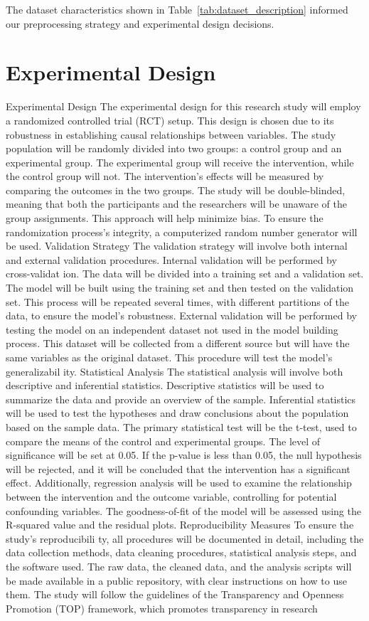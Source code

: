 \documentclass[conference]{IEEEtran}
\begin{document}
The dataset characteristics shown in Table~\ref{tab:dataset_description} informed our preprocessing strategy and experimental design decisions.

\section{Experimental Design}
Experimental Design The experimental design for this research study will employ a randomized controlled trial (RCT) setup. This design is chosen due to its robustness in establishing causal relationships between variables. The study population will be randomly divided into two groups: a control group and an experimental group. The experimental group will receive the intervention, while the control group will not. The intervention's effects will be measured by comparing the outcomes in the two groups. The study will be double-blinded, meaning that both the participants and the researchers will be unaware of the group assignments. This approach will help minimize bias. To ensure the randomization process's integrity, a computerized random number generator will be used. Validation Strategy The validation strategy will involve both internal and external validation procedures. Internal validation will be performed by cross-validat ion. The data will be divided into a training set and a validation set. The model will be built using the training set and then tested on the validation set. This process will be repeated several times, with different partitions of the data, to ensure the model's robustness. External validation will be performed by testing the model on an independent dataset not used in the model building process. This dataset will be collected from a different source but will have the same variables as the original dataset. This procedure will test the model's generalizabil ity. Statistical Analysis The statistical analysis will involve both descriptive and inferential statistics. Descriptive statistics will be used to summarize the data and provide an overview of the sample. Inferential statistics will be used to test the hypotheses and draw conclusions about the population based on the sample data. The primary statistical test will be the t-test, used to compare the means of the control and experimental groups. The level of significance will be set at 0.05. If the p-value is less than 0.05, the null hypothesis will be rejected, and it will be concluded that the intervention has a significant effect. Additionally, regression analysis will be used to examine the relationship between the intervention and the outcome variable, controlling for potential confounding variables. The goodness-of-fit of the model will be assessed using the R-squared value and the residual plots. Reproducibility Measures To ensure the study's reproducibili ty, all procedures will be documented in detail, including the data collection methods, data cleaning procedures, statistical analysis steps, and the software used. The raw data, the cleaned data, and the analysis scripts will be made available in a public repository, with clear instructions on how to use them. The study will follow the guidelines of the Transparency and Openness Promotion (TOP) framework, which promotes transparency in research 
\end{document}
